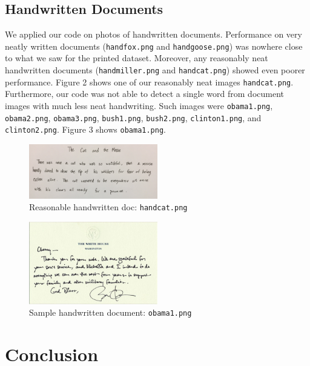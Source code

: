 \documentclass[11pt,letterpaper]{article}
\begin{document}
\subsection{Handwritten Documents}

We applied our code on photos of handwritten documents. Performance on very neatly written documents ({\tt hand\textunderscore fox.png} and {\tt hand\textunderscore goose.png}) was nowhere close to what we saw for the printed dataset. Moreover, any reasonably neat handwritten documents ({\tt hand\textunderscore miller.png} and {\tt hand\textunderscore cat.png}) showed even poorer performance. Figure 2 shows one of our reasonably neat images {\tt hand\textunderscore cat.png}. Furthermore, our code was not able to detect a single word from document images with much less neat handwriting. Such images were {\tt obama1.png}, {\tt obama2.png}, {\tt obama3.png}, {\tt bush1.png}, {\tt bush2.png}, {\tt clinton1.png}, and {\tt clinton2.png}. Figure 3 shows {\tt obama1.png}.

\begin{figure}[t!]
  \centering
  \includegraphics[keepaspectratio, width=0.5\textwidth]{cat.png}
  \caption{Reasonable handwritten doc: {\tt hand\textunderscore cat.png}}
\end{figure}

\begin{figure}[t!]
  \centering
  \includegraphics[keepaspectratio, width=0.5\textwidth]{obama4.png}
  \caption{Sample handwritten document: {\tt obama1.png}}
\end{figure}


\section{Conclusion}
\end{document}
